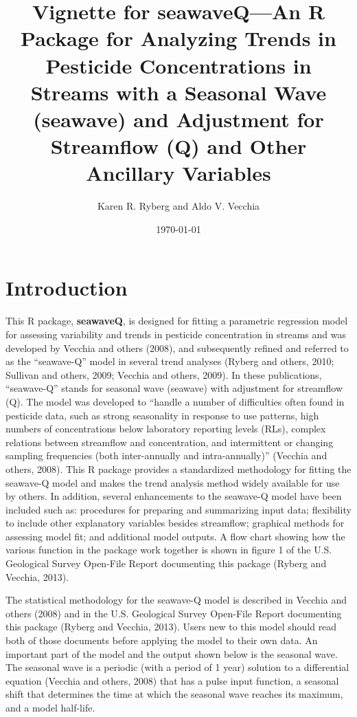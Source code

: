 \documentclass[11pt]{article}
\title{Vignette for seawaveQ---An R Package for Analyzing Trends in Pesticide Concentrations in Streams with a Seasonal Wave (seawave) and Adjustment for Streamflow (Q) and Other Ancillary Variables}
\author{Karen R. Ryberg and Aldo V. Vecchia}
\date{\today}                                %
\begin{document}
\maketitle
\tableofcontents

\section{Introduction}

This R package, \textbf{seawaveQ}, is designed  for fitting a parametric regression model for assessing variability and trends in pesticide concentration in streams and was developed by Vecchia and others (2008), and subsequently refined and referred to as the ``seawave-Q'' model in several trend analyses (Ryberg and others, 2010; Sullivan and others, 2009; Vecchia and others, 2009).  In these publications, ``seawave-Q'' stands for seasonal wave (seawave) with adjustment for streamflow (Q).  The model was developed to ``handle a number of difficulties often found in pesticide data, such as strong seasonality in response to use patterns, high numbers of concentrations below laboratory reporting levels (RLs), complex relations between streamflow and concentration, and intermittent or changing sampling frequencies (both inter-annually and intra-annually)'' (Vecchia and others, 2008).  This R package provides a standardized methodology for fitting the seawave-Q model and makes the trend analysis method widely available for use by others. In addition, several enhancements to the seawave-Q model have been included such as: procedures for preparing and summarizing input data; flexibility to include other explanatory variables besides streamflow; graphical methods for assessing model fit; and additional model outputs.    A flow chart showing how the various function in the package work together is shown in figure 1 of the U.S. Geological Survey Open-File Report documenting this package (Ryberg and Vecchia, 2013). 

The statistical methodology for the seawave-Q model is described in Vecchia and others (2008) and in the U.S. Geological Survey Open-File Report documenting this package (Ryberg and Vecchia, 2013).   Users new to this model should read both of those documents before applying the model to their own data.  An important part of the model and the output shown below is the seasonal wave. The seasonal wave is a periodic (with a period of 1 year) solution to a differential equation (Vecchia and others, 2008) that has a pulse input function, a seasonal shift that determines the time at which the seasonal wave reaches its maximum, and a model half-life.
\end{document}
